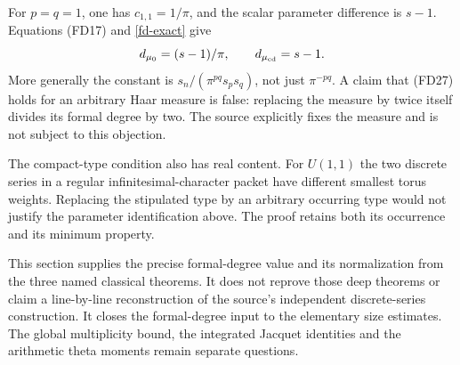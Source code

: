 For $p=q=1$, one has $c_{1,1}=1/\pi$, and the scalar
parameter difference is $s-1$. Equations (FD17) and
\eqref{fd-exact} give
\[
               d_{\mu_0}=(s-1)/\pi,\qquad
               d_{\mu_{\rm cd}}=s-1.
\]
More generally the constant is $s_n/(\pi^{pq}s_ps_q)$,
not just $\pi^{-pq}$. A claim that (FD27) holds for an
arbitrary Haar measure is false: replacing the measure
by twice itself divides its formal degree by two.
The source explicitly fixes the measure and is not
subject to this objection.

The compact-type condition also has real content.
For $U(1,1)$ the two discrete series in a regular
infinitesimal-character packet have different smallest
torus weights. Replacing the stipulated type by an
arbitrary occurring type would not justify the
parameter identification above. The proof retains
both its occurrence and its minimum property.

This section supplies the precise formal-degree value
and its normalization from the three named classical
theorems. It does not reprove those deep theorems or
claim a line-by-line reconstruction of the source's
independent discrete-series construction. It closes
the formal-degree input to the elementary size estimates.
The global multiplicity bound, the integrated Jacquet
identities and the arithmetic theta moments remain
separate questions.


